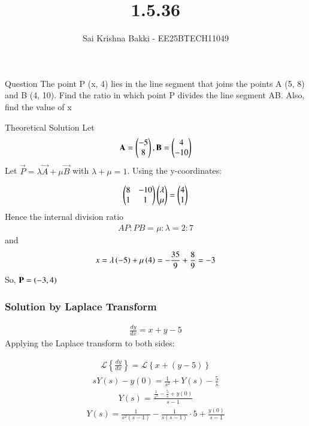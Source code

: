 \documentclass{beamer}
\title %
{1.5.36}
\date{}
\author %
{Sai Krishna Bakki - EE25BTECH11049}
\begin{document}
\frame{\titlepage}
\begin{frame}{Question}
The point P (x, 4) lies in the line segment that joins the points A (5, 8) and B (4, 10). Find the ratio in which point P divides the line segment AB. Also, find the value of x
\end{frame}


\begin{frame}{Theoretical Solution}
Let 
\begin{align*}
\mathbf{A}= \begin{pmatrix}-5 \\ 8\end{pmatrix}, \mathbf{B}= \begin{pmatrix}4 \\ -10\end{pmatrix}
\end{align*}
Let $\vec{P} = \lambda\vec{A} + \mu\vec{B}$ with $\lambda + \mu =1$. Using the y-coordinates:

\begin{align}
    \begin{pmatrix}8 & -10 \\ 1 & 1\end{pmatrix} \begin{pmatrix}\lambda \\ \mu\end{pmatrix} = \begin{pmatrix}4 \\ 1\end{pmatrix}
\end{align}
Hence the internal division ratio
\begin{align}
    AP:PB = \mu:\lambda=2:7
\end{align}
and
\begin{align}
   x=\lambda\left(-5\right)+\mu\left(4\right)= -\frac{35}{9} + \frac{8}{9} = -3
\end{align}
So, $\mathbf{P}=\left(-3,4\right)$

\end{frame}
\begin{frame}
\frametitle{Solution by Laplace Transform}
\begin{align}
    \frac{dy}{dx} = x+y-5
\end{align}
Applying the Laplace transform to both sides:

\begin{align}
    \mathcal{L}\left\{\frac{dy}{dx}\right\} = \mathcal{L}\left\{x + (y - 5)\right\}
\end{align}
\begin{align}
    sY(s) - y(0) = \frac{1}{s^2} + Y(s) - \frac{5}{s}
\end{align}
\begin{align}
    Y(s) = \frac{\frac{1}{s^2} - \frac{5}{s} + y(0)}{s - 1}
\end{align}
\begin{align}
    Y(s) = \frac{1}{s^2 (s - 1)} - \frac{1}{s (s - 1)} \cdot 5 + \frac{y(0)}{s - 1}
\end{align}
\end{frame}
\end{document}
